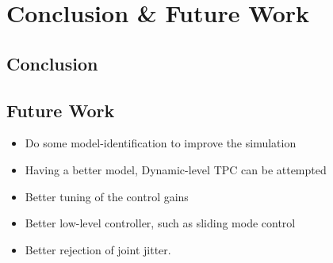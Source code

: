\chapter{Conclusion \& Future Work}
\label{ch:conclusion}

\section{Conclusion}

\section{Future Work}
\label{sec:conclusion:future_work}

\begin{itemize}
    \item Do some model-identification to improve the simulation
    \item Having a better model, Dynamic-level TPC can be attempted
    \item Better tuning of the control gains
    \item Better low-level controller, such as sliding mode control
    \item Better rejection of joint jitter.
\end{itemize}
